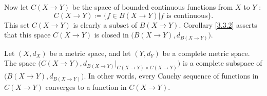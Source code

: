 \begin{note}
    Now let \(C(X \to Y)\) be the space of bounded continuous functions from \(X\) to \(Y\) :
    \[
        C(X \to Y) \coloneqq \{f \in B(X \to Y) | f \text{ is continuous}\}.
    \]
    This set \(C(X \to Y)\) is clearly a subset of \(B(X \to Y)\).
    Corollary \ref{3.3.2} asserts that this space \(C(X \to Y)\) is closed in \(\big(B(X \to Y), d_{B(X \to Y)}\big)\).
\end{note}

\begin{theorem}\label{3.4.5}
    Let \((X, d_X)\) be a metric space, and let \((Y, d_Y)\) be a complete metric space.
    The space \(\big(C(X \to Y), d_{B(X \to Y)}|_{C(X \to Y) \times C(X \to Y)}\big)\) is a complete subspace of \(\big(B(X \to Y), d_{B(X \to Y)}\big)\).
    In other words, every Cauchy sequence of functions in \(C(X \to Y)\) converges to a function in \(C(X \to Y)\).
\end{theorem}

